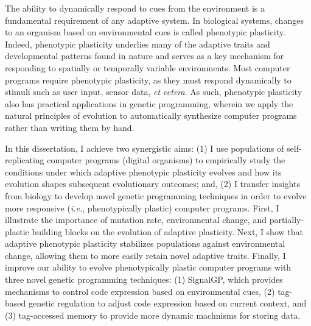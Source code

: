 
The ability to dynamically respond to cues from the environment is a fundamental requirement of any adaptive system.
In biological systems, changes to an organism based on environmental cues is called phenotypic plasticity.
Indeed, phenotypic plasticity underlies many of the adaptive traits and developmental patterns found in nature and serves as a key mechanism for responding to spatially or temporally variable environments.
Most computer programs require phenotypic plasticity, as they must respond dynamically to stimuli such as user input, sensor data, \textit{et cetera}. 
As such, phenotypic plasticity also has practical applications in genetic programming, wherein we apply the natural principles of evolution to automatically synthesize computer programs rather than writing them by hand.

In this dissertation, I achieve two synergistic aims: (1) I use populations of self-replicating computer programs (digital organisms) to empirically study the conditions under which adaptive phenotypic plasticity evolves and how its evolution shapes subsequent evolutionary outcomes; and, (2) I transfer insights from biology to develop novel genetic programming techniques in order to evolve more responsive (\textit{i.e.}, phenotypically plastic) computer programs. %
First, I illustrate the importance of mutation rate, environmental change, and partially-plastic building blocks on the evolution of adaptive plasticity. 
Next, I show that adaptive phenotypic plasticity stabilizes populations against environmental change, allowing them to more easily retain novel adaptive traits. 
Finally, I improve our ability to evolve phenotypically plastic computer programs with three novel genetic programming techniques: 
(1) SignalGP, which provides mechanisms to control code expression based on environmental cues, (2) tag-based genetic regulation to adjust code expression based on current context, and (3) tag-accessed memory to provide more dynamic machnisms for storing data.



